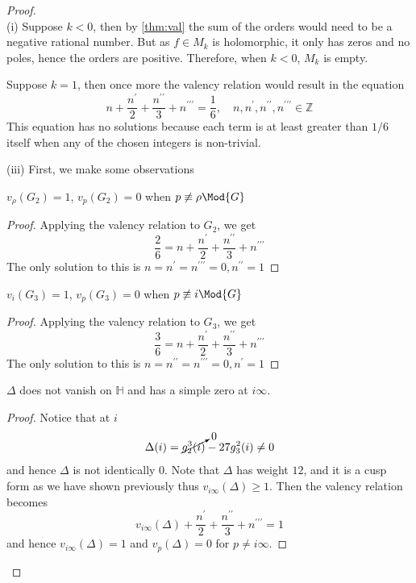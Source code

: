 \documentclass[12pt]{article}
\theoremstyle{definition}
\begin{document}
\begin{proof}~\\
(i) Suppose \(k<0\), then by \cref{thm:val} the sum of the orders would need to be a negative rational number. But as \(f \in M_k\) is holomorphic, it only has zeros and no poles, hence the orders are positive. Therefore, when \(k<0\), \(M_k\) is empty.

Suppose \(k=1\), then once more the valency relation would result in the equation
\[
    n + \frac{n^{\prime} }{2} + \frac{n^{\prime\prime} }{3} +n^{\prime\prime\prime} = \frac{1}{6},\quad n,n^{\prime} ,n^{\prime\prime},n^{\prime\prime\prime} \in \mathbb{Z} 
\]
This equation has no solutions because each term is at least greater than \(1/6\) itself when any of the chosen integers is non-trivial. 


(iii) First, we make some observations
\begin{claim}
    \(v_{\rho }(G_2) =1 \), \(v_p(G_2)=0\) when \(p \not\equiv \rho \Mod{G}\)   
\end{claim}
\begin{proof}
Applying the valency relation to \(G_2\), we get
\[
    \frac{2}{6} = n + \frac{n^{\prime} }{2}+\frac{n^{\prime\prime} }{3} + n^{\prime\prime\prime} 
\] 
The only solution to this is \(n=n^{\prime} =n^{\prime\prime\prime} =0,n^{\prime\prime} =1\) 
\end{proof}

\begin{claim}
    \(v_i(G_3)=1\), \(v_p(G_3)=0\) when \(p \not\equiv i \Mod{G}\)    
\end{claim}
\begin{proof}
Applying the valency relation to \(G_3\), we get
\[
    \frac{3}{6} = n + \frac{n^{\prime} }{2}+\frac{n^{\prime\prime} }{3} + n^{\prime\prime\prime} 
\] 
The only solution to this is \(n=n^{\prime\prime} =n^{\prime\prime\prime} =0,n^{\prime} =1\) 
\end{proof}

\begin{claim}
    \(\Delta \) does not vanish on \(\mathbb{H} \) and has a simple zero at \(i\infty \).
\end{claim}
\begin{proof}
Notice that at \(i\) 
\[
    \Delta (i) = \cancelto{0}{g_2^3(i)} -27g_3^2(i) \ne 0
\]
and hence \(\Delta \) is not identically \(0\). Note that \(\Delta \) has weight \(12\), and it is a cusp form as we have shown previously thus \(v_{i\infty } (\Delta )\geq 1\). Then the valency relation becomes 
\[
    v_{i\infty } (\Delta ) + \frac{n^{\prime} }{2}+\frac{n^{\prime\prime} }{3} + n^{\prime\prime\prime} =1
\]  
and hence \(v_{i\infty } (\Delta ) =1\) and \(v_p(\Delta )=0\) for \(p \ne i\infty  \).   
\end{proof}


\end{proof}
\end{document}
